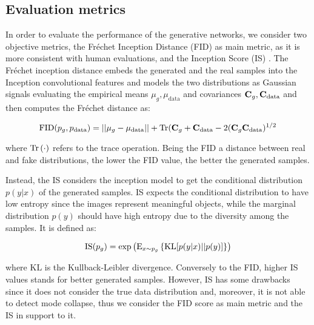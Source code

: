 \documentclass[graybox]{svmult}
\begin{document}
\subsection{Evaluation metrics}
In order to evaluate the performance of the generative networks, we consider two objective metrics, the Fréchet Inception Distance (FID) \cite{HeuselFID2017} as main metric, as it is more consistent with human evaluations, and the Inception Score (IS) \cite{SalimansIS2016}. The Fréchet inception distance embeds the generated and the real samples into the Inception convolutional features and models the two distributions as Gaussian signals evaluating the empirical means $\mu_g, \mu_{\text{data}}$ and covariances ${\mathbf C}_g, {\mathbf C}_{\text{data}}$ and then computes the Fréchet distance as:

\begin{equation}
    \text{FID}(p_g, p_{\text{data}}) = ||\mu_g - \mu_{\text{data}} || + \operatorname{Tr}({\mathbf C}_g + {\mathbf C}_{\text{data}} -2({\mathbf C}_g{\mathbf C}_{\text{data}})^{1/2}
\end{equation}

\noindent where $\operatorname{Tr}\left(\cdot\right)$ refers to the trace operation. Being the FID a distance between real and fake distributions, the lower the FID value, the better the generated samples.

Instead, the IS considers the inception model to get the conditional distribution $p(y|x)$ of the generated samples. IS expects the conditional distribution to have low entropy since the images represent meaningful objects, while the marginal distribution $p(y)$ should have high entropy due to the diversity among the samples. It is defined as:

\begin{equation}
    \text{IS}(p_g) = \exp\left(\text{E}_{x \sim p_g} \left\{\text{KL}[p(y|x)||p(y)]\right\}\right)
\end{equation}

\noindent where $\text{KL}$ is the Kullback-Leibler divergence. Conversely to the FID, higher IS values stands for better generated samples. However, IS has some drawbacks since it does not consider the true data distribution and, moreover, it is not able to detect mode collapse, thus we consider the FID score as main metric and the IS in support to it. 
\end{document}
